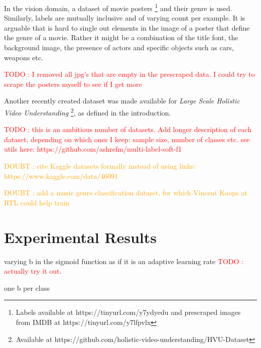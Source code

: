 \documentclass[sigconf,natbib,screen=true,review=true,anonymous]{acmart}
\newcommand\todo[1]{\textcolor{red}{TODO : #1}}
\newcommand\doubt[1]{\textcolor{orange}{DOUBT : #1}}
\begin{document}
In the vision domain, a dataset of movie posters \footnote{Labels available at https://tinyurl.com/y7ydyedu and prescraped images from IMDB at https://tinyurl.com/y7lfpvlx} and their genre is used. Similarly, labels are mutually inclusive and of varying count per example. It is arguable that is hard to single out elements in the image of a poster that define the genre of a movie. Rather it might be a combination of the title font, the background image, the presence of actors and specific objects such as cars, weapons etc. 




\todo{I removed all jpg's that are empty in the prescraped data. I could try to scrape the posters myself to see if I get more}

Another recently created dataset was made available for \emph{Large Scale Holistic Video Understanding} \cite{holisticVideoData} \footnote{Available at https://github.com/holistic-video-understanding/HVU-Dataset}, as defined in the introduction.





\todo{this is an ambitious number of datasets. Add longer description of each dataset, depending on which ones I keep: sample size, number of classes etc. see utils here: https://github.com/ashrefm/multi-label-soft-f1}

\doubt{cite Kaggle datasets formally instead of using links: https://www.kaggle.com/data/46091}

\doubt{add a music genre classification dataset, for which Vincent Koops at RTL could help train}


\section{Experimental Results}
\label{sec:orgc23a664}

varying b in the sigmoid function as if it is an adaptive learning rate \todo{actually try it out}.

one b per class
\end{document}
